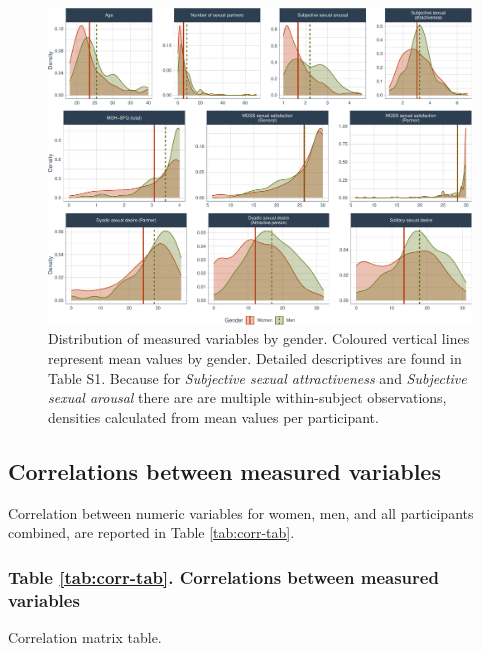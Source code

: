 \documentclass[
  bookmarksnumbered]{article}
\begin{document}
\begin{figure}
\centering
\includegraphics{Deseo_excitacion_sexual_files/figure-latex/density-plot-1.pdf}
\caption{\label{fig:density-plot}Distribution of measured variables by gender. Coloured vertical lines represent mean values by gender. Detailed descriptives are found in Table S1. Because for \emph{Subjective sexual attractiveness} and \emph{Subjective sexual arousal} there are are multiple within-subject observations, densities calculated from mean values per participant.}
\end{figure}

\hypertarget{correlations-between-measured-variables}{%
\subsection{Correlations between measured variables}\label{correlations-between-measured-variables}}

Correlation between numeric variables for women, men, and all participants combined, are reported in Table \ref{tab:corr-tab}.

\hypertarget{table-reftabcorr-tab.-correlations-between-measured-variables}{%
\subsubsection{Table \ref{tab:corr-tab}. Correlations between measured variables}\label{table-reftabcorr-tab.-correlations-between-measured-variables}}

Correlation matrix table.
\end{document}
